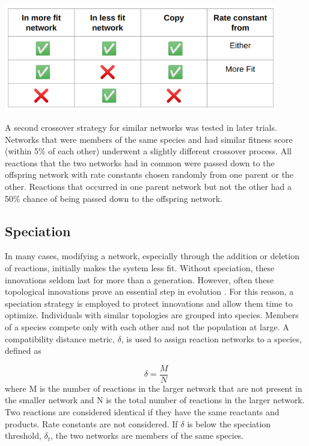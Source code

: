 \documentclass[12pt]{report}
\begin{document}
\begin{center}
    \includegraphics[width=12cm]{images/crossover_table.png}
    \label{table:crossover_table}
\end{center}

A second crossover strategy for similar networks was tested in later trials. Networks that were members of the same species and had similar fitness score (within 5\% of each other) underwent a slightly different crossover process. All reactions that the two networks had in common were passed down to the offspring network with rate constants chosen randomly from one parent or the other. Reactions that occurred in one parent network but not the other had a 50\% chance of being passed down to the offspring network.

\subsection{Speciation}
In many cases, modifying a network, especially through the addition or deletion of reactions, initially makes the system less fit. Without speciation, these innovations seldom last for more than a generation. However, often these topological innovations prove an essential step in evolution \cite{stanley_evolving_2002}. For this reason, a speciation strategy is employed to protect innovations and allow them time to optimize. Individuals with similar topologies are grouped into species. Members of a species compete only with each other and not the population at large.  A compatibility distance metric, $\delta$, is used to assign reaction networks to a species, defined as

\begin{equation}
\delta=\frac{M}{N}
\end{equation}
where M is the number of reactions in the larger network that are not present in the smaller network and N is the total number of reactions in the larger network. Two reactions are considered identical if they have the same reactants and products. Rate constants are not considered. If $\delta$ is below the speciation threshold, $\delta_{t}$, the two networks are members of the same species.
\end{document}
